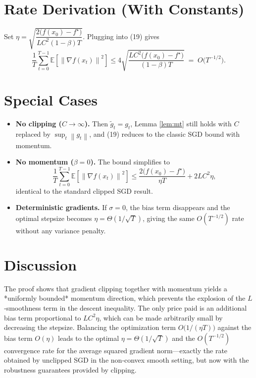 \documentclass{article}
\newcommand{\EE}{\mathbb{E}}
\newcommand{\norm}[1]{\left\|#1\right\|}
\begin{document}
\section*{Rate Derivation (With Constants)}
Set $\eta = \sqrt{\dfrac{2\bigl(f(x_{0})-f^{\star}\bigr)}{L C^{2}(1-\beta)T}}$.
Plugging into (19) gives
\[
\frac{1}{T}\sum_{t=0}^{T-1}\EE[\norm{\nabla f(x_{t})}^{2}]
\le
4\sqrt{\frac{L C^{2}\bigl(f(x_{0})-f^{\star}\bigr)}{(1-\beta)T}}
\;=\;O\!\bigl(T^{-1/2}\bigr).
\]

\section*{Special Cases}
\begin{itemize}
\item \textbf{No clipping ($C\to\infty$).}  Then $\tilde g_{t}=g_{t}$, Lemma \ref{lem:mt} still holds with $C$ replaced by $\sup_{t}\norm{g_{t}}$, and (19) reduces to the classic SGD bound with momentum.
\item \textbf{No momentum ($\beta=0$).}  The bound simplifies to
\[
\frac{1}{T}\sum_{t=0}^{T-1}\EE[\norm{\nabla f(x_{t})}^{2}]
\le
\frac{2\bigl(f(x_{0})-f^{\star}\bigr)}{\eta T}+2L C^{2}\eta,
\]
identical to the standard clipped SGD result.
\item \textbf{Deterministic gradients.}  If $\sigma=0$, the bias term disappears and the optimal stepsize becomes $\eta = \Theta(1/\sqrt{T})$, giving the same $O(T^{-1/2})$ rate without any variance penalty.
\end{itemize}

\section*{Discussion}
The proof shows that gradient clipping together with momentum yields a *uniformly bounded* momentum direction, which prevents the explosion of the $L$‑smoothness term in the descent inequality. The only price paid is an additional bias term proportional to $LC^{2}\eta$, which can be made arbitrarily small by decreasing the stepsize. Balancing the optimization term $O\bigl(1/(\eta T)\bigr)$ against the bias term $O(\eta)$ leads to the optimal $\eta = \Theta(1/\sqrt{T})$ and the $O(T^{-1/2})$ convergence rate for the average squared gradient norm—exactly the rate obtained by unclipped SGD in the non‑convex smooth setting, but now with the robustness guarantees provided by clipping.
\end{document}
